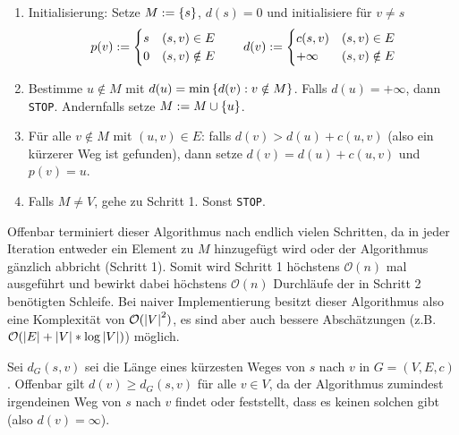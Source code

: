 \begin{enumerate}[label=Schritt \arabic*:, leftmargin=*, start=0]
	\item Initialisierung: Setze $M \mathrel{:=} \left\{ s \right\}$, $d(s) = 0$ und initialisiere für $v \neq s$
	\begin{equation*}
		p(v) \mathrel{:=} \begin{cases}
		s & (s,v) \in E \\ 0 & (s,v) \notin E
		\end{cases} 
		\qquad
		d(v) \mathrel{:=} \begin{cases}
		c(s,v) & (s,v) \in E \\ +\infty &(s,v) \notin E
		\end{cases}
	\end{equation*}
	\item Bestimme $u \notin M$ mit $d(u) = \min\left\{ d(v) : v \notin M \right\}$. Falls $d(u) = +\infty$, dann \texttt{STOP}. Andernfalls setze $M \mathrel{:=} M \cup \left\{ u \right\}$.
	\item Für alle $v \notin M$ mit $(u,v) \in E$: falls $d(v) > d(u) + c(u,v)$ (also ein kürzerer Weg ist gefunden), dann setze $d(v) = d(u) + c(u,v)$ und $p(v) = u$.
	\item Falls $M \neq V$, gehe zu Schritt 1. Sonst \texttt{STOP}.
\end{enumerate}

Offenbar terminiert dieser Algorithmus nach endlich vielen Schritten, da in jeder Iteration entweder ein Element zu $M$ hinzugefügt wird oder der Algorithmus gänzlich abbricht (Schritt 1). Somit wird Schritt 1 höchstens $\mathcal{O}(n)$ mal ausgeführt und bewirkt dabei höchstens $\mathcal{O}(n)$ Durchläufe der in Schritt 2 benötigten Schleife. Bei naiver Implementierung besitzt dieser Algorithmus also eine Komplexität von $\mathcal{O}(\left| V \right|^2)$, es sind aber auch bessere Abschätzungen (z.B. $\mathcal{O}(\left| E \right| + \left| V \right| * \log\left| V \right|)$) möglich.

Sei $d_G(s,v)$ sei die Länge eines kürzesten Weges von $s$ nach $v$ in $G= (V,E,c)$. Offenbar gilt $d(v) \ge d_G(s,v)$ für alle $v \in V$, da der Algorithmus zumindest irgendeinen Weg von $s$ nach $v$ findet oder feststellt, dass es keinen solchen gibt (also $d(v) = \infty$).

